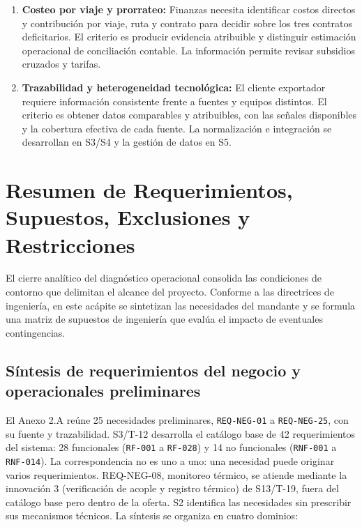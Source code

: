 \begin{enumerate}
  \item \textbf{Costeo por viaje y prorrateo:} Finanzas necesita identificar costos directos y contribución por viaje, ruta y contrato para decidir sobre los tres contratos deficitarios. El criterio es producir evidencia atribuible y distinguir estimación operacional de conciliación contable. La información permite revisar subsidios cruzados y tarifas.
  \item \textbf{Trazabilidad y heterogeneidad tecnológica:} El cliente exportador requiere información consistente frente a fuentes y equipos distintos. El criterio es obtener datos comparables y atribuibles, con las señales disponibles y la cobertura efectiva de cada fuente. La normalización e integración se desarrollan en S3/S4 y la gestión de datos en S5.
\end{enumerate}

\section{Resumen de Requerimientos, Supuestos, Exclusiones y Restricciones}\label{sec:2-requerimientos}

El cierre analítico del diagnóstico operacional consolida las condiciones de contorno que delimitan el alcance del proyecto. Conforme a las directrices de ingeniería, en este acápite se sintetizan las necesidades del mandante y se formula una matriz de supuestos de ingeniería que evalúa el impacto de eventuales contingencias.

\subsection{Síntesis de requerimientos del negocio y operacionales preliminares}\label{sec:2-req-sintesis}

El Anexo 2.A reúne 25 necesidades preliminares, \texttt{REQ-NEG-01} a \texttt{REQ-NEG-25}, con su fuente y trazabilidad. S3/T-12 desarrolla el catálogo base de 42 requerimientos del sistema: 28 funcionales (\texttt{RF-001} a \texttt{RF-028}) y 14 no funcionales (\texttt{RNF-001} a \texttt{RNF-014}). La correspondencia no es uno a uno: una necesidad puede originar varios requerimientos. REQ-NEG-08, monitoreo térmico, se atiende mediante la innovación 3 (verificación de acople y registro térmico) de S13/T-19, fuera del catálogo base pero dentro de la oferta. S2 identifica las necesidades sin prescribir sus mecanismos técnicos. La síntesis se organiza en cuatro dominios:

